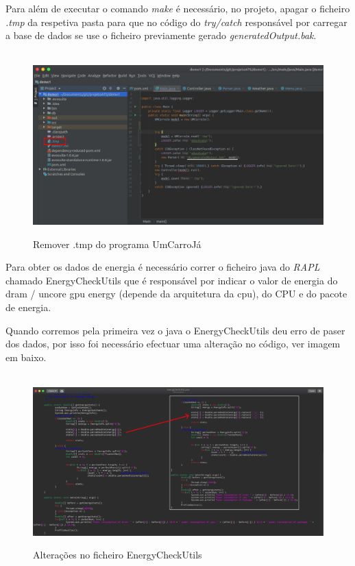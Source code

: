 Para além de executar o comando \textit{make} é necessário, no projeto, apagar o ficheiro \textit{.tmp} da respetiva pasta para que no código do \textit{try/catch} responsável por carregar a base de dados se  use o ficheiro previamente gerado \textit{generatedOutput.bak}.


\begin{figure}[H]
    \centering
    \hbox{\hspace{-4em} \includegraphics[width=1.2\textwidth]{images/remove_tmp.png}}
    \label{fig49}
    \caption{Remover .tmp do programa UmCarroJá}
\end{figure}

Para obter os dados de energia é necessário correr o ficheiro java do \textit{RAPL} chamado EnergyCheckUtils que é responsável por indicar o valor de energia do dram / uncore gpu energy (depende da arquitetura da cpu), do CPU e do pacote de energia.

Quando corremos pela primeira vez o java o EnergyCheckUtils deu erro de paser dos dados, por isso foi necessário efectuar uma alteração no código, ver imagem em baixo.


\begin{figure}[H]
    \hbox{\hspace{-10em} \includegraphics[width=1.5\textwidth]{images/energycheckutils.png}}
    \label{fig50}
    \caption{Alterações no ficheiro EnergyCheckUtils}
\end{figure}

